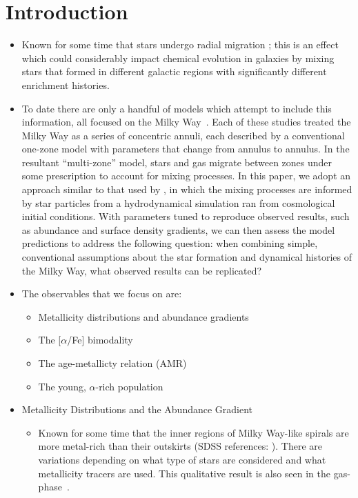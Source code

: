 \documentclass[fleqn, usenatbib]{mnras}
\begin{document}
\section{Introduction} 
\label{sec:intro} 
\begin{itemize} 
	\item Known for some time that stars undergo radial migration 
	\citep[e.g.][]{Wielen1996}; this is an effect which could considerably 
	impact chemical evolution in galaxies by mixing stars that formed in 
	different galactic regions with significantly different enrichment 
	histories. 

	\item To date there are only a handful of models which attempt to include 
	this information, all focused on the Milky Way~\citep[e.g.][]{Matteucci1989, 
	Schoenrich2009, Minchev2013, Sharma2020}. Each of these 
	studies treated the Milky Way as a series of concentric annuli, each 
	described by a conventional one-zone model with parameters that change from 
	annulus to annulus. In the resultant ``multi-zone'' model, stars and gas 
	migrate between zones under some prescription to account for mixing 
	processes. In this paper, we adopt an approach similar to that used by 
	\citet{Minchev2013}, in which the mixing processes are informed by star 
	particles from a hydrodynamical simulation ran from cosmological initial 
	conditions. With parameters tuned to reproduce observed results, such as 
	abundance and surface density gradients, we can then assess the model 
	predictions to address the following question: when combining simple, 
	conventional assumptions about the star formation and dynamical histories 
	of the Milky Way, what observed results can be replicated? 
	
	\item The observables that we focus on are: 
	\begin{itemize} 
		\item Metallicity distributions and abundance gradients 

		\item The [$\alpha$/Fe] bimodality 

		\item The age-metallicty relation (AMR) 

		\item The young, $\alpha$-rich population
	\end{itemize} 

	\item Metallicity Distributions and the Abundance Gradient 
	\begin{itemize} 
		\item Known for some time that the inner regions of Milky Way-like 
		spirals are more metal-rich than their outskirts (SDSS references: 
		\citealp{Nordstroem2004a, Daflon2009, Frinchaboy2013, Hayden2014}). 
		There are variations depending on what type of stars are considered 
		and what metallicity tracers are used. This qualitative result is 
		also seen in the gas-phase~\citep[see, e.g., the results from the 
		CHAOS project using HII regions;][]{Berg2015, Berg2020}. 


\end{itemize}
\end{itemize}
\end{document}
